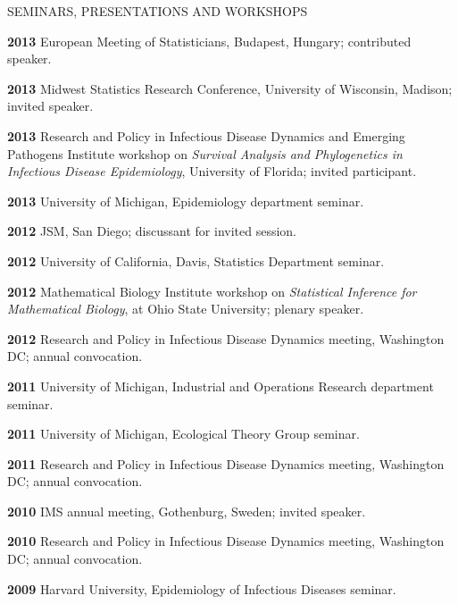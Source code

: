 \begin{mylist}{SEMINARS, PRESENTATIONS AND WORKSHOPS}
\item{\bf 2013 } European Meeting of Statisticians, Budapest, Hungary; contributed speaker.

\item{\bf 2013 } Midwest Statistics Research Conference, University of Wisconsin, Madison;  invited speaker.

\item{\bf 2013 }  Research and Policy in Infectious Disease Dynamics and Emerging Pathogens Institute workshop on {\it Survival Analysis and Phylogenetics in Infectious Disease Epidemiology}, University of Florida; invited participant.

\item{\bf 2013 } University of Michigan, Epidemiology department seminar.

\item{\bf 2012 } JSM, San Diego; discussant for invited session.

\item{\bf 2012 } University of California, Davis, Statistics Department seminar.

\item{\bf 2012 } Mathematical Biology Institute workshop on {\it Statistical Inference for Mathematical Biology}, at Ohio State University; plenary speaker.

\item{\bf 2012 } Research and Policy in Infectious Disease Dynamics meeting, Washington DC; annual convocation.

\item{\bf 2011 } University of Michigan, Industrial and Operations Research department seminar.

\item{\bf 2011 } University of Michigan, Ecological Theory Group seminar.

\item{\bf 2011 } Research and Policy in Infectious Disease Dynamics meeting, Washington DC; annual convocation.

\item{\bf 2010 } IMS annual meeting, Gothenburg, Sweden; invited speaker.

\item{\bf 2010 } Research and Policy in Infectious Disease Dynamics meeting, Washington DC; annual convocation.

\item{\bf 2009 } Harvard University, Epidemiology of Infectious Diseases seminar.


\end{mylist}
